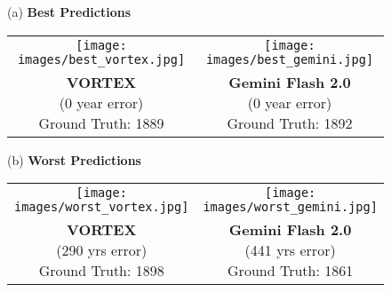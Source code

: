 \documentclass[10pt,twocolumn,letterpaper]{article}
\begin{document}
\begin{figure}[t]
\centering

(a) \textbf{Best Predictions} \\[0.5em]
\begin{tabular}{cc}
    \texttt{[image: images/best\_vortex.jpg]} &
    \texttt{[image: images/best\_gemini.jpg]} \\
    \makecell{\textbf{VORTEX}\\ (0 year error) \\ Ground Truth: 1889} & \makecell{\textbf{Gemini Flash 2.0}\\ (0 year error) \\ Ground Truth: 1892} \\
\end{tabular}

\vspace{0.5em}




\vspace{2em}

(b) \textbf{Worst Predictions} \\[0.5em]
\begin{tabular}{cc}
    \texttt{[image: images/worst\_vortex.jpg]} &
    \texttt{[image: images/worst\_gemini.jpg]} \\
    \makecell{\textbf{VORTEX}\\ (290 yrs error)\\ Ground Truth: 1898} & \makecell{\textbf{Gemini Flash 2.0} \\ (441 yrs error)\\ Ground Truth: 1861} \\
\end{tabular}


\end{figure}
\end{document}
